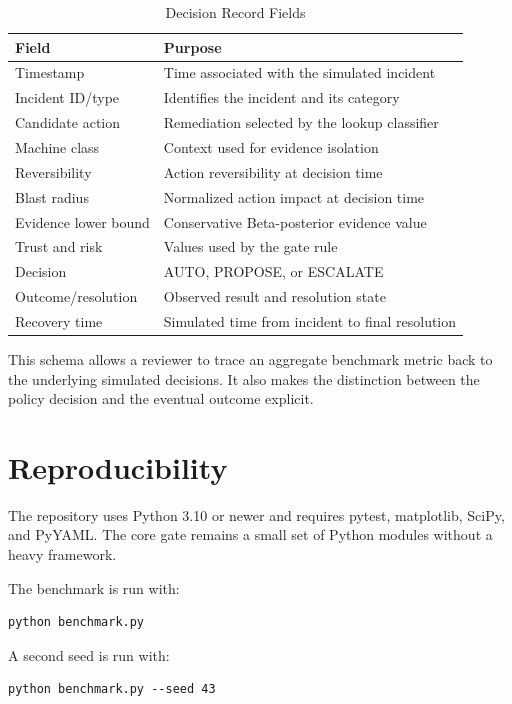 \documentclass[conference]{IEEEtran}
\begin{document}
\begin{table}[htbp]
\centering
\caption{Decision Record Fields}
\label{tab:log_schema}
\begin{tabular}{p{}p{}}
\toprule
Field & Purpose\\
\midrule
Timestamp & Time associated with the simulated incident\\
Incident ID/type & Identifies the incident and its category\\
Candidate action & Remediation selected by the lookup classifier\\
Machine class & Context used for evidence isolation\\
Reversibility & Action reversibility at decision time\\
Blast radius & Normalized action impact at decision time\\
Evidence lower bound & Conservative Beta-posterior evidence value\\
Trust and risk & Values used by the gate rule\\
Decision & AUTO, PROPOSE, or ESCALATE\\
Outcome/resolution & Observed result and resolution state\\
Recovery time & Simulated time from incident to final resolution\\
\bottomrule
\end{tabular}
\end{table}

This schema allows a reviewer to trace an aggregate benchmark metric back to
the underlying simulated decisions. It also makes the distinction between the
policy decision and the eventual outcome explicit.

\section{Reproducibility}
The repository uses Python 3.10 or newer and requires pytest, matplotlib,
SciPy, and PyYAML. The core gate remains a small set of Python
modules without a heavy framework.

The benchmark is run with:

\begin{verbatim}
python benchmark.py
\end{verbatim}

A second seed is run with:

\begin{verbatim}
python benchmark.py --seed 43
\end{verbatim}
\end{document}
